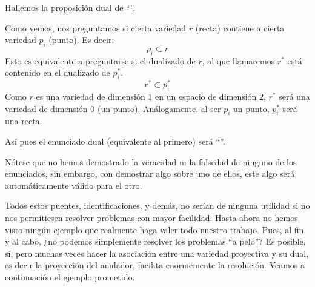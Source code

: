 \begin{exa}
	Hallemos la proposición dual de ``''.
	
	Como vemos, nos preguntamos si cierta variedad $r$ (recta) contiene a cierta variedad $p_i$ (punto). Es decir:
	\[p_i\subset r\]
	Esto es equivalente a preguntarse si el dualizado de $r$, al que llamaremos $r^*$ está contenido en el dualizado de $p_i^*$.
	\[r^*\subset p_i^*\]
	Como $r$ es una variedad de dimensión $1$ en un espacio de dimensión $2$, $r^*$ será una variedad de dimensión $0$ (un punto). Análogamente, al ser $p_i$ un punto, $p_i^*$ será una recta.
	
	Así pues el enunciado dual (equivalente al primero) será ``''.
	
	Nótese que no hemos demostrado la veracidad ni la falsedad de ninguno de los enunciados, sin embargo, con demostrar algo sobre uno de ellos, este algo será automáticamente válido para el otro.
\end{exa}
Todos estos puentes, identificaciones, y demás, no serían de ninguna utilidad si no nos permitiesen resolver problemas con mayor facilidad. Hasta ahora no hemos visto ningún ejemplo que realmente haga valer todo nuestro trabajo. Pues, al fin y al cabo, ¿no podemos simplemente resolver los problemas ``a pelo''? Es posible, sí, pero muchas veces hacer la asociación entre una variedad proyectiva y su dual, es decir la proyección del anulador, facilita enormemente la resolución. Veamos a continuación el ejemplo prometido.

